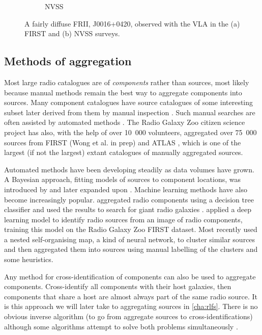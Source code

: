 \documentclass[11pt, a4paper]{book}
\begin{document}
\begin{figure}
\begin{subfigure}{0.45\textwidth}
                \caption{NVSS}
                \label{fig:im-contours-nvss}
            \end{subfigure}
            \caption[An example of a `resolved out' radio galaxy.]{\label{fig:resolved-out} A fairly diffuse FRII, J0016+0420, observed with the VLA in the (a) FIRST \citep{becker95first} and (b) NVSS \citep{condon98nvss} surveys. \citep[GRG1 from ][]{dabhade_discovery_2017}}
        \end{figure}

    \subsection{Methods of aggregation}
    \label{sec:methods-aggregation}

        Most large radio catalogues are of \emph{components} rather than sources, most likely because manual methods remain the best way to aggregate components into sources. Many component catalogues have source catalogues of some interesting subset later derived from them by manual inspection \citep[e.g.][]{dabhade_discovery_2017}. Such manual searches are often assisted by automated methods \citep[e.g.][]{proctor_morphological_2011}. The Radio Galaxy Zoo citizen science project has also, with the help of over 10~000 volunteers, aggregated over 75~000 sources from FIRST (Wong et al. in prep) and ATLAS \citep{banfield15}, which is one of the largest (if not the largest) extant catalogues of manually aggregated sources.

        Automated methods have been developing steadily as data volumes have grown. A Bayesian approach, fitting models of sources to component locations, was introduced by \citet{fan15} and later expanded upon \citep{fan_optimal_2020}. Machine learning methods have also become increasingly popular. \citet{proctor_selection_2016} aggregated radio components using a decision tree classifier and used the results to search for giant radio galaxies \citep[see also][]{proctor_morphological_2011,proctor06}. \citet{wu19claran} applied a deep learning model to identify radio sources from an image of radio components, training this model on the Radio Galaxy Zoo FIRST dataset. Most recently \citet{galvin_cataloguing_2020} used a nested self-organising map, a kind of neural network, to cluster similar sources and then aggregated them into sources using manual labelling of the clusters and some heuristics.

        Any method for cross-identification of components can also be used to aggregate components. Cross-identify all components with their host galaxies, then components that share a host are almost always part of the same radio source. It is this approach we will later take to aggregating sources in \autoref{cha:rlfs}. There is no obvious inverse algorithm (to go from aggregate sources to cross-identifications) although some algorithms attempt to solve both problems simultaneously \citep{fan_optimal_2020,fan15}.
\end{document}
